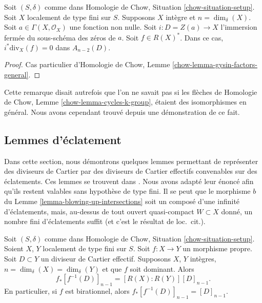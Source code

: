 \begin{lemma}
\label{lemma-gysin-factors-principal}
Soit $(S, \delta)$ comme dans Homologie de Chow, Situation \ref{chow-situation-setup}.
Soit $X$ localement de type fini sur $S$.
Supposons $X$ intègre et $n = \dim_\delta(X)$.
Soit $a \in \Gamma(X, \mathcal{O}_X)$ une fonction non nulle.
Soit $i : D = Z(a) \to X$ l'immersion fermée du sous-schéma des zéros de $a$.
Soit $f \in R(X)^*$.
Dans ce cas, $i^*\text{div}_X(f) = 0$ dans $A_{n - 2}(D)$.
\end{lemma}

\begin{proof}
Cas particulier d'Homologie de Chow, Lemme \ref{chow-lemma-gysin-factors-general}.
\end{proof}

\begin{remark}
\label{remark-not-true-not-quasi-compact}
Cette remarque disait autrefois que l'on ne savait pas si les flèches de
Homologie de Chow, Lemme \ref{chow-lemma-cycles-k-group}, étaient des isomorphismes
en général. Nous avons cependant trouvé depuis une démonstration de ce fait.
\end{remark}







\subsection{Lemmes d'éclatement}
\label{section-blowing-up-lemmas}

\noindent
Dans cette section, nous démontrons quelques lemmes permettant de représenter
des diviseurs de Cartier par des diviseurs de Cartier effectifs convenables
sur des éclatements. Ces lemmes se trouvent dans \cite[Section 2.4]{F}.
Nous avons adapté leur énoncé afin qu'ils restent valables
sans hypothèse de type fini. Il se peut que le morphisme $b$
du Lemme \ref{lemma-blowing-up-intersections} soit un composé
d'une infinité d'éclatements, mais, au-dessus de tout ouvert quasi-compact
$W \subset X$ donné, un nombre fini d'éclatements suffit
(et c'est le résultat de loc.\ cit.).

\begin{lemma}
\label{lemma-push-pull-effective-Cartier}
Soit $(S, \delta)$ comme dans Homologie de Chow, Situation \ref{chow-situation-setup}.
Soient $X$, $Y$ localement de type fini sur $S$.
Soit $f : X \to Y$ un morphisme propre.
Soit $D \subset Y$ un diviseur de Cartier effectif.
Supposons $X$, $Y$ intègres, $n = \dim_\delta(X) = \dim_\delta(Y)$ et
que $f$ soit dominant. Alors
$$
f_*[f^{-1}(D)]_{n - 1} = [R(X) : R(Y)] [D]_{n - 1}.
$$
En particulier, si $f$ est birationnel, alors $f_*[f^{-1}(D)]_{n - 1} = [D]_{n - 1}$.
\end{lemma}

